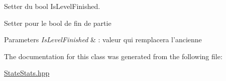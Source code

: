 Setter du bool Is\+Level\+Finished. 

Setter pour le bool de fin de partie


\begin{DoxyParams}{Parameters}
{\em Is\+Level\+Finished} & \+: valeur qui remplacera l'ancienne \\
\hline
\end{DoxyParams}


The documentation for this class was generated from the following file\+:\begin{DoxyCompactItemize}
\item 
\hyperlink{_state_stats_8hpp}{State\+Stats.\+hpp}\end{DoxyCompactItemize}
